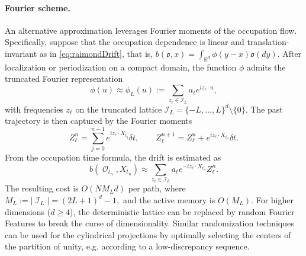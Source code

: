\documentclass[11pt]{article}
\numberwithin{equation}{section}
\theoremstyle{plain}
\theoremstyle{definition}
\DeclareMathOperator{\calI}{\mathcal{I}}
\DeclareMathOperator{\calO}{\mathcal{O}}
\def\mo{\mathfrak{o}}
\newcommand{\rr}[1]{\textcolor{red}{#1}}
\begin{document}
\paragraph{Fourier scheme.} An alternative approximation leverages Fourier moments of the occupation flow. %
Specifically, suppose that the
occupation dependence is linear and translation-invariant as in \eqref{eq:raimondDrift}, that is, %
$
b(\mo,x)=\int_{\mathbb R^d}\phi(y-x)\mo(dy).$  
After localization or periodization on a compact domain, the function $\phi$ admits the truncated Fourier representation
\begin{equation}\label{eq:Fourier}
    \phi(u) \approx \phi_L(u) := \sum_{z_\ell \in \mathcal{I}_L}
a_\ell e^{i z_\ell \cdot u},
\end{equation}
with frequencies $z_\ell$ on the truncated lattice $\mathcal{I}_L = \{-L, \dots, L\}^d \setminus \{0\}$. The past trajectory is then captured by the Fourier moments
\[
Z_\ell^n
=
\sum_{j=0}^{n-1}e^{i z_\ell \cdot X_{t_j}} \delta t,
\qquad
Z_\ell^{n+1}
=
Z_\ell^n+ e^{i z_\ell \cdot X_{t_n}}  \delta t.
\]
From the occupation time formula, the drift is estimated  as
$$b(\calO_{t_n},X_{t_n}) \approx %
\sum_{z_\ell \in \mathcal{I}_L}
a_\ell e^{-i z_\ell \cdot X_{t_n}}Z_\ell^n .$$
The resulting cost is $O(N M_L d)$ per path, where $M_L := |\calI_L|= (2L+1)^d - 1,$ and the active memory is $O(M_L)$. For higher dimensions ($d \ge 4$), the deterministic lattice can be replaced by random Fourier Features %
to break the curse of dimensionality. Similar randomization techniques can be used for the cylindrical projections by optimally selecting the centers of the partition of unity, e.g. according to a low-discrepancy sequence. 
\end{document}
